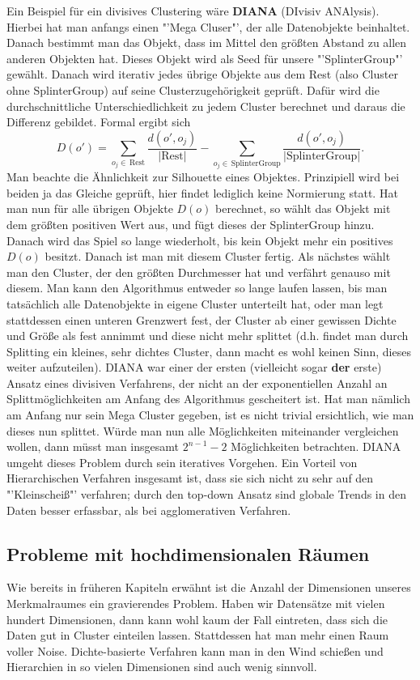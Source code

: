 Ein Beispiel für ein divisives Clustering wäre \textbf{DIANA} (DIvisiv ANAlysis).
Hierbei hat man anfangs einen "'Mega Cluser"', der alle Datenobjekte beinhaltet.
Danach bestimmt man das Objekt, dass im Mittel den größten Abstand zu allen
anderen Objekten hat. Dieses Objekt wird als Seed für unsere "'SplinterGroup"'
gewählt. Danach wird iterativ jedes übrige Objekte aus dem Rest (also Cluster
ohne SplinterGroup) auf seine Clusterzugehörigkeit geprüft. Dafür wird die
durchschnittliche Unterschiedlichkeit zu jedem Cluster berechnet und daraus
die Differenz gebildet. Formal ergibt sich
\[D(o') = \sum_{o_j \in\, \text{Rest}} \frac{d(o',o_j)}{\lvert \text{Rest}
\rvert} - \sum_{o_j \in\, \text{SplinterGroup}} \frac{d(o',o_j)}{\vert
\text{SplinterGroup} \rvert}.\]
Man beachte die Ähnlichkeit zur Silhouette eines Objektes. Prinzipiell wird bei
beiden ja das Gleiche geprüft, hier findet lediglich keine Normierung statt.
Hat man nun für alle übrigen Objekte \(D(o)\) berechnet, so wählt das Objekt
mit dem größten positiven Wert aus, und fügt dieses der SplinterGroup hinzu. 
Danach wird das Spiel so lange wiederholt, bis kein Objekt mehr ein positives 
\(D(o)\) besitzt. Danach ist man mit diesem Cluster fertig. Als nächstes wählt
man den Cluster, der den größten Durchmesser hat und verfährt genauso mit 
diesem. Man kann den Algorithmus entweder so lange laufen lassen, bis man
tatsächlich alle Datenobjekte in eigene Cluster unterteilt hat, oder man legt
stattdessen einen unteren Grenzwert fest, der Cluster ab einer gewissen Dichte
und Größe als fest annimmt und diese nicht mehr splittet (d.h. findet man durch
Splitting ein kleines, sehr dichtes Cluster, dann macht es wohl keinen Sinn, 
dieses weiter aufzuteilen). DIANA war einer der ersten (vielleicht sogar 
\textbf{der} erste) Ansatz eines divisiven Verfahrens, der nicht an der
exponentiellen Anzahl an Splittmöglichkeiten am Anfang des Algorithmus
gescheitert ist. Hat man nämlich am Anfang nur sein Mega Cluster gegeben, ist
es nicht trivial ersichtlich, wie man dieses nun splittet. Würde man nun alle
Möglichkeiten miteinander vergleichen wollen, dann müsst man insgesamt
\(2^{n-1}-2\) Möglichkeiten betrachten. DIANA umgeht dieses Problem durch
sein iteratives Vorgehen. Ein Vorteil von Hierarchischen Verfahren insgesamt ist,
dass sie sich nicht zu sehr auf den "'Kleinscheiß"' verfahren; durch den top-down
Ansatz sind globale Trends in den Daten besser erfassbar, als bei 
agglomerativen Verfahren.

\subsection{Probleme mit hochdimensionalen Räumen}
Wie bereits in früheren Kapiteln erwähnt ist die Anzahl der Dimensionen unseres
Merkmalraumes ein gravierendes Problem. Haben wir Datensätze mit vielen 
hundert Dimensionen, dann kann wohl kaum der Fall eintreten, dass sich die
Daten gut in Cluster einteilen lassen. Stattdessen hat man mehr einen Raum
voller Noise. Dichte-basierte Verfahren kann man in den Wind schießen und
Hierarchien in so vielen Dimensionen sind auch wenig sinnvoll.

